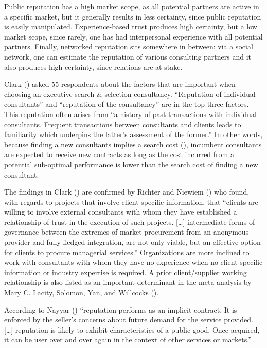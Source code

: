 \documentclass[
  man,floatsintext]{apa6}
\begin{document}
Public reputation has a high market scope, as all potential partners are active in a specific market, but it generally results in less certainty, since public reputation is easily manipulated. Experience-based trust produces high certainty, but a low market scope, since rarely, one has had interpersonal experience with all potential partners. Finally, networked reputation sits somewhere in between: via a social network, one can estimate the reputation of various consulting partners and it also produces high certainty, since relations are at stake.

Clark () asked 55 respondents about the factors that are important when choosing an executive search \& selection consultancy. ``Reputation of individual consultants'' and ``reputation of the consultancy'' are in the top three factors. This reputation often arises from ``a history of past transactions with individual consultants. Frequent transactions between consultants and clients leads to familiarity which underpins the latter's assessment of the former.'' In other words, because finding a new consultants implies a search cost (), incumbent consultants are expected to receive new contracts as long as the cost incurred from a potential sub-optimal performance is lower than the search cost of finding a new consultant.

The findings in Clark () are confirmed by Richter and Niewiem () who found, with regards to projects that involve client-specific information, that ``clients are willing to involve external consultants with whom they have established a relationship of trust in the execution of such projects. {[}\ldots{]} intermediate forms of governance between the extremes of market procurement from an anonymous provider and fully-fledged integration, are not only viable, but an effective option for clients to procure managerial services.'' Organizations are more inclined to work with consultants with whom they have no experience when no client-specific information or industry expertise is required. A prior client/supplier working relationship is also listed as an important determinant in the meta-analysis by Mary C. Lacity, Solomon, Yan, and Willcocks ().

According to Nayyar () ``reputation performs as an implicit contract. It is enforced by the seller's concerns about future demand for the service provided. {[}\ldots{]} reputation is likely to exhibit characteristics of a public good. Once acquired, it can be user over and over again in the context of other services or markets.''
\end{document}
